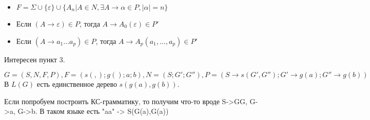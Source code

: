 \begin{itemize}
\item $F=\Sigma \cup \{\varepsilon\} \cup \{A_n | A \in N, \exists A \rightarrow \alpha \in P, |\alpha| = n\}$
\item Если $(A \rightarrow \varepsilon) \in P$, тогда $A \rightarrow A_0(\varepsilon) \in P'$
\item Если $(A \rightarrow a_1 \dots a_p) \in P$, тогда $A \rightarrow A_p(a_1, \dots, a_p) \in P'$
\end{itemize}


Интересен пункт 3.

$G=(S,N,F,P), F =(s(,); g(); a; b), N=(S;G';G''), P = (S \rightarrow s(G',G'');G' \rightarrow g(a); G'' \rightarrow g(b))$
В $L(G)$ есть единственное дерево $s(g(a),g(b))$.

Если попробуем построить КС-грамматику, то получим что-то вроде S->GG, G->a, G->b. В таком языке есть "aa" -> S(G(a),G(a))